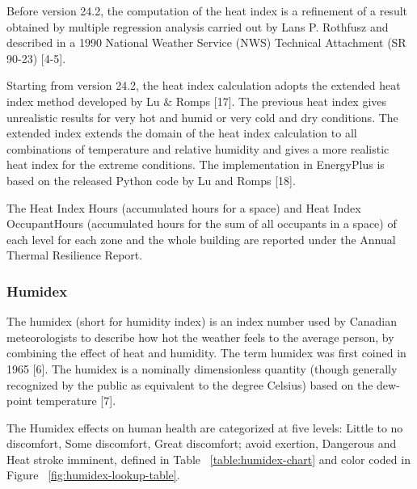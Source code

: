 Before version 24.2, the computation of the heat index is a refinement of a result obtained by
multiple regression analysis carried out by Lans P. Rothfusz and described in a
1990 National Weather Service (NWS) Technical Attachment (SR 90-23) [4-5].

Starting from version 24.2, the heat index calculation adopts the extended heat
index method developed by Lu \& Romps [17]. The previous heat index gives
unrealistic results for very hot and humid or very cold and dry conditions. The
extended index extends the domain of the heat index calculation to all
combinations of temperature and relative humidity and gives a more realistic heat
index for the extreme conditions. The implementation in EnergyPlus is based on
the released Python code by Lu and Romps [18].

The Heat Index Hours (accumulated hours for a space) and Heat Index
OccupantHours (accumulated hours for the sum of all occupants in a space) of
each level for each zone and the whole building are reported under the Annual
Thermal Resilience Report.

\subsubsection{Humidex}\label{humidex}

The humidex (short for humidity index) is an index number used by Canadian
meteorologists to describe how hot the weather feels to the average person, by
combining the effect of heat and humidity. The term humidex was first coined in
1965 [6]. The humidex is a nominally dimensionless quantity (though generally
recognized by the public as equivalent to the degree Celsius) based on the
dew-point temperature [7].

The Humidex effects on human health are categorized at five levels: Little to no
discomfort, Some discomfort, Great discomfort; avoid exertion, Dangerous and
Heat stroke imminent, defined in Table ~\ref{table:humidex-chart} and color
coded in Figure ~\ref{fig:humidex-lookup-table}.

